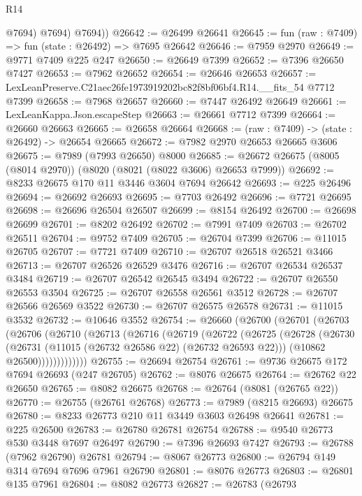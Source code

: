 \begin{lexlean}{R14}
\begin{coremodule}
            @7694)
          @7694)
        @7694))
@26642 := @26499 @26641
@26645 := fun (raw : @7409) => fun (state : @26492) => @7695 @26642
@26646 := @7959 @2970
@26649 := @9771 @7409 @225 @247
@26650 := @26649 @7399
@26652 := @7396 @26650 @7427
@26653 := @7962 @26652
@26654 := @26646 @26653
@26657 := LexLeanPreserve.C21aec26fe1973919202bc82f8bf06bf4.R14.__fits_54 @7712 @7399
@26658 := @7968 @26657
@26660 := @7447 @26492 @26649
@26661 := LexLeanKappa.Json.escapeStep
@26663 := @26661 @7712 @7399
@26664 := @26660 @26663
@26665 := @26658 @26664
@26668 := (raw : @7409) -> (state : @26492) -> @26654 @26665
@26672 := @7982 @2970 @26653 @26665 @3606
@26675 := @7989 (@7993 @26650) @8000
@26685 := @26672 @26675 (@8005 (@8014 @2970)) (@8020 (@8021 (@8022 @3606) @26653 @7999))
@26692 := @8233 @26675 @170 @11 @3446 @3604 @7694 @26642
@26693 := @225 @26496
@26694 := @26692 @26693
@26695 := @7703 @26492
@26696 := @7721 @26695
@26698 := @26696 @26504 @26507
@26699 := @8154 @26492
@26700 := @26698 @26699
@26701 := @8202 @26492
@26702 := @7991 @7409
@26703 := @26702 @26511
@26704 := @9752 @7409
@26705 := @26704 @7399
@26706 := @11015 @26705
@26707 := @7721 @7409
@26710 := @26707 @26518 @26521 @3466
@26713 := @26707 @26526 @26529 @3476
@26716 := @26707 @26534 @26537 @3484
@26719 := @26707 @26542 @26545 @3494
@26722 := @26707 @26550 @26553 @3504
@26725 := @26707 @26558 @26561 @3512
@26728 := @26707 @26566 @26569 @3522
@26730 := @26707 @26575 @26578
@26731 := @11015 @3532
@26732 := @10646 @3552
@26754 := @26660
    (@26700
      (@26701
        (@26703
          (@26706
            (@26710
              (@26713
                (@26716
                  (@26719
                    (@26722
                      (@26725
                        (@26728
                          (@26730
                            (@26731 (@11015 (@26732 @26586 @22) (@26732 @26593 @22)))
                            (@10862 @26500)))))))))))))
@26755 := @26694 @26754
@26761 := @9736 @26675 @172 @7694 @26693 (@247 @26705)
@26762 := @8076 @26675
@26764 := @26762 @22 @26650
@26765 := @8082 @26675
@26768 := @26764 (@8081 (@26765 @22))
@26770 := @26755 (@26761 @26768)
@26773 := @7989 (@8215 @26693) @26675
@26780 := @8233 @26773 @210 @11 @3449 @3603 @26498 @26641
@26781 := @225 @26500
@26783 := @26780 @26781 @26754
@26788 := @9540 @26773 @530 @3448 @7697 @26497
@26790 := @7396 @26693 @7427
@26793 := @26788 (@7962 @26790) @26781
@26794 := @8067 @26773
@26800 := @26794 @149 @314 @7694 @7696 @7961 @26790
@26801 := @8076 @26773
@26803 := @26801 @135 @7961
@26804 := @8082 @26773
@26827 := @26783
    (@26793

\end{coremodule}
\end{lexlean}
